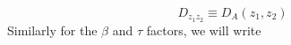 \begin{equation}
D_{z_1z_2} \equiv D_A(z_1, z_2)
\end{equation}
Similarly for the $\beta$ and $\tau$ factors, we will write